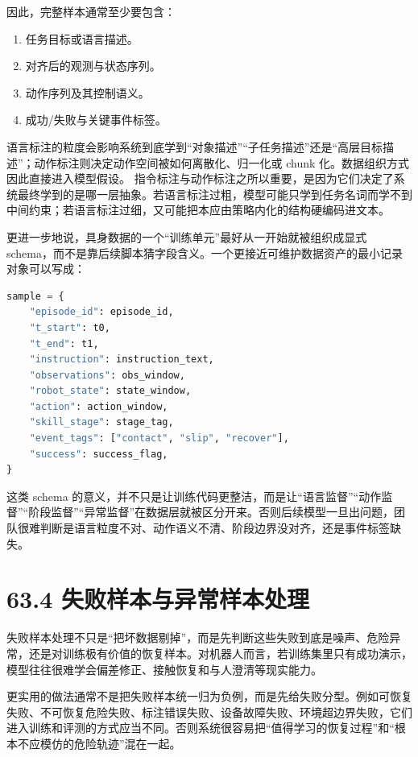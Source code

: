 因此，完整样本通常至少要包含：

\begin{enumerate}
\item 任务目标或语言描述。
\item 对齐后的观测与状态序列。
\item 动作序列及其控制语义。
\item 成功/失败与关键事件标签。
\end{enumerate}

语言标注的粒度会影响系统到底学到“对象描述”“子任务描述”还是“高层目标描述”；动作标注则决定动作空间被如何离散化、归一化或 chunk 化。数据组织方式因此直接进入模型假设。 指令标注与动作标注之所以重要，是因为它们决定了系统最终学到的是哪一层抽象。若语言标注过粗，模型可能只学到任务名词而学不到中间约束；若语言标注过细，又可能把本应由策略内化的结构硬编码进文本。

更进一步地说，具身数据的一个“训练单元”最好从一开始就被组织成显式 schema，而不是靠后续脚本猜字段含义。一个更接近可维护数据资产的最小记录对象可以写成：

\begin{lstlisting}[language=python]
sample = {
    "episode_id": episode_id,
    "t_start": t0,
    "t_end": t1,
    "instruction": instruction_text,
    "observations": obs_window,
    "robot_state": state_window,
    "action": action_window,
    "skill_stage": stage_tag,
    "event_tags": ["contact", "slip", "recover"],
    "success": success_flag,
}
\end{lstlisting}

这类 schema 的意义，并不只是让训练代码更整洁，而是让“语言监督”“动作监督”“阶段监督”“异常监督”在数据层就被区分开来。否则后续模型一旦出问题，团队很难判断是语言粒度不对、动作语义不清、阶段边界没对齐，还是事件标签缺失。

\section*{63.4 失败样本与异常样本处理}


失败样本处理不只是“把坏数据剔掉”，而是先判断这些失败到底是噪声、危险异常，还是对训练极有价值的恢复样本。对机器人而言，若训练集里只有成功演示，模型往往很难学会偏差修正、接触恢复和与人澄清等现实能力。

更实用的做法通常不是把失败样本统一归为负例，而是先给失败分型。例如可恢复失败、不可恢复危险失败、标注错误失败、设备故障失败、环境超边界失败，它们进入训练和评测的方式应当不同。否则系统很容易把“值得学习的恢复过程”和“根本不应模仿的危险轨迹”混在一起。

